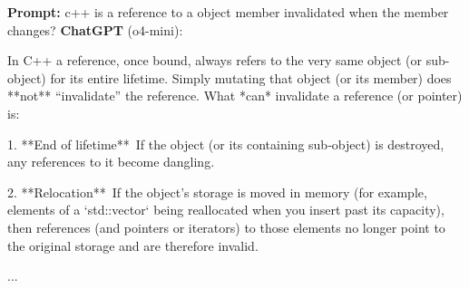 \textbf{Prompt:} c++ is a reference to a object member invalidated when the member changes?
\tcblower
\textbf{ChatGPT} (o4-mini):\par
\begin{markdown}
In C++ a reference, once bound, always refers to the very same object (or sub-object) for its entire lifetime. Simply mutating that object (or its member) does **not** “invalidate” the reference. What *can* invalidate a reference (or pointer) is:

1. **End of lifetime**\
   If the object (or its containing sub‐object) is destroyed, any references to it become dangling.

2. **Relocation**\
   If the object's storage is moved in memory (for example, elements of a `std::vector` being reallocated when you insert past its capacity), then references (and pointers or iterators) to those elements no longer point to the original storage and are therefore invalid.

...
\end{markdown}
